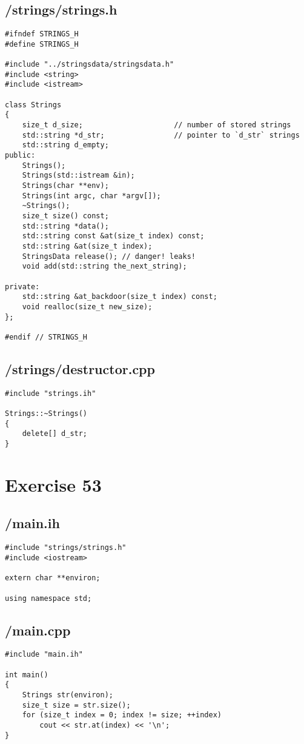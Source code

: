\documentclass{article}
\begin{document}
\subsection*{/strings/strings.h}
\begin{verbatim}
#ifndef STRINGS_H
#define STRINGS_H

#include "../stringsdata/stringsdata.h"
#include <string>
#include <istream>

class Strings 
{
    size_t d_size;                     // number of stored strings
    std::string *d_str;                // pointer to `d_str` strings
    std::string d_empty;
public:
    Strings();
    Strings(std::istream &in);
    Strings(char **env);
    Strings(int argc, char *argv[]);
    ~Strings();
    size_t size() const;
    std::string *data();
    std::string const &at(size_t index) const;
    std::string &at(size_t index);
    StringsData release(); // danger! leaks!
    void add(std::string the_next_string);

private:
    std::string &at_backdoor(size_t index) const;
    void realloc(size_t new_size);
};

#endif // STRINGS_H

\end{verbatim}
\subsection*{/strings/destructor.cpp}
\begin{verbatim}
#include "strings.ih"

Strings::~Strings()
{
    delete[] d_str;
}
\end{verbatim}


\section*{Exercise 53}
\subsection*{/main.ih}
\begin{verbatim}
#include "strings/strings.h"
#include <iostream>

extern char **environ;

using namespace std;

\end{verbatim}
\subsection*{/main.cpp}
\begin{verbatim}
#include "main.ih"

int main()
{
    Strings str(environ);
    size_t size = str.size();
    for (size_t index = 0; index != size; ++index)
        cout << str.at(index) << '\n';
}
\end{verbatim}
\end{document}
